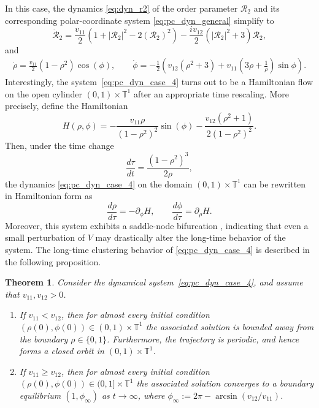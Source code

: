 \documentclass[10pt]{article}
\newtheorem{theorem}{Theorem}[section]
\theoremstyle{definition}
\theoremstyle{definition}
\numberwithin{equation}{section}
\newcommand{\BBT}{\mathbb{T}}
\newcommand{\CR}{\mathcal{R}}
\begin{document}
In this case, the dynamics \eqref{eq:dyn_r2} of the order parameter $\CR_2$ and its corresponding polar-coordinate system \eqref{eq:pc_dyn_general} simplify to
\begin{equation}
\dot{\CR}_2 = \frac{v_{11}}{2} \left( 1 + |\CR_2|^2 - 2 (\CR_2)^2 \right) - \frac{iv_{12}}{2} \left( |\CR_2|^2 + 3 \right) \CR_2,
\end{equation}
and
\begin{equation}
\label{eq:pc_dyn_case_4}
\begin{aligned} 
        \dot \rho = \frac{v_{11}}{2} (1- \rho^2) \cos(\phi), \qquad        \dot \phi = -\frac{1}{2} \left( v_{12} (\rho^2 + 3) + v_{11} \left(3 \rho + \frac{1}{\rho} \right) \sin \phi \right) .
\end{aligned}
\end{equation}
Interestingly, the system~\eqref{eq:pc_dyn_case_4} turns out to be a Hamiltonian flow on the open cylinder $(0,1) \times \BBT^1$ after an appropriate time rescaling.  
More precisely, define the Hamiltonian
\[H(\rho, \phi) = -\frac{v_{11}\rho}{(1-\rho^2)^2}\sin(\phi) - \frac{v_{12}(\rho^2 + 1)}{2(1-\rho^2)^2} .
\]
Then, under the time change 
\begin{equation}
\frac{d\tau}{dt}=\frac{(1-\rho^2)^3}{2\rho},
\end{equation}
the dynamics \eqref{eq:pc_dyn_case_4} on the domain $(0,1) \times \BBT^1$ can be rewritten in Hamiltonian form as
\begin{equation}
\label{eq:hamiltonian_form}
\frac{d\rho}{d\tau} = - \partial_{\phi} H, \qquad \frac{d\phi}{d\tau} = \partial_{\rho} H .
\end{equation}
Moreover, this system exhibits a saddle-node bifurcation \cite{strogatz2024nonlinear}, indicating that even a small perturbation of $V$ may drastically alter the long-time behavior of the system.
The long-time clustering behavior of \eqref{eq:pc_dyn_case_4} is described in the following proposition.

\begin{theorem}\label{thm:case_4}
    Consider the dynamical system~\eqref{eq:pc_dyn_case_4}, and assume that $v_{11}, v_{12} > 0$.
    \begin{enumerate}
        \item If $v_{11} < v_{12}$, then for almost every initial condition $(\rho(0), \phi(0)) \in (0,1) \times \BBT^1$ the associated solution is bounded away from the boundary $\rho \in \{0,1\}$. Furthermore, the trajectory is periodic, and hence forms a closed orbit in $(0,1) \times \BBT^1$.
        \item If $v_{11} \geq v_{12}$, then for almost every initial condition $(\rho(0), \phi(0)) \in (0,1] \times \BBT^1$ the associated solution converges to a boundary equilibrium $(1, \phi_{\infty})$ as $t \to \infty$,  
        where $\phi_{\infty} := 2\pi - \arcsin(v_{12}/v_{11})$.
    \end{enumerate}
\end{theorem}
\end{document}
